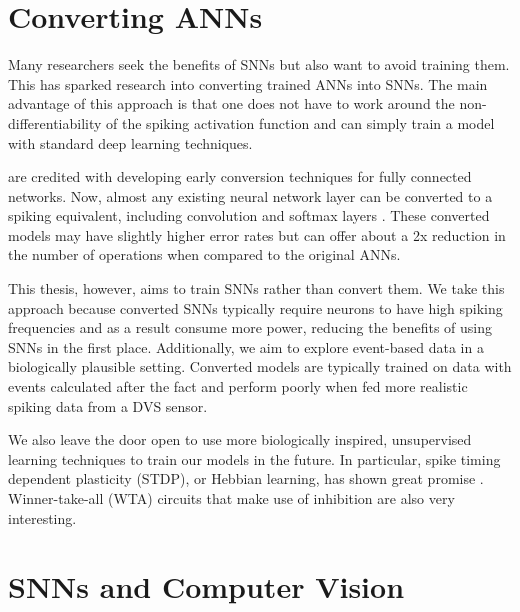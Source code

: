 \documentclass [MS] {UCLAthesis}
\begin{document}


\section{Converting ANNs}

Many researchers seek the benefits of SNNs but also want to avoid training them. This has sparked research into converting trained ANNs into SNNs. The main advantage of this approach is that one does not have to work around the non-differentiability of the spiking activation function and can simply train a model with standard deep learning techniques.

\citet{convert_no_bias} are credited with developing early conversion techniques for fully connected networks. Now, almost any existing neural network layer can be converted to a spiking equivalent, including convolution and softmax layers \citep{convert_with_bias}. These converted models may have slightly higher error rates but can offer about a 2x reduction in the number of operations when compared to the original ANNs.

This thesis, however, aims to train SNNs rather than convert them. We take this approach because converted SNNs typically require neurons to have high spiking frequencies and as a result consume more power, reducing the benefits of using SNNs in the first place. Additionally, we aim to explore event-based data in a biologically plausible setting. Converted models are typically trained on data with events calculated after the fact and perform poorly when fed more realistic spiking data from a DVS sensor.

We also leave the door open to use more biologically inspired, unsupervised learning techniques to train our models in the future. In particular, spike timing dependent plasticity (STDP), or Hebbian learning, has shown great promise \citep{KHERADPISHEH201856}. Winner-take-all (WTA) circuits that make use of inhibition are also very interesting.


\section{SNNs and Computer Vision}
\end{document}
